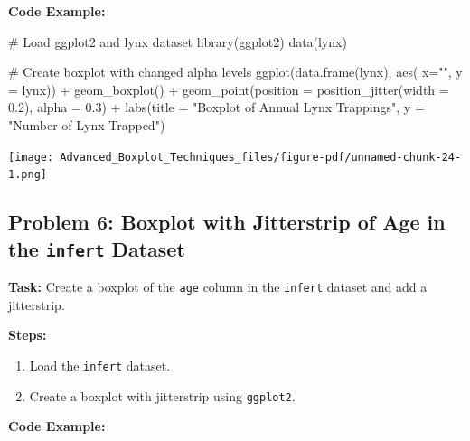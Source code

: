 \documentclass[
  letterpaper,
  DIV=11,
  numbers=noendperiod]{scrreprt}
\newenvironment{Shaded}{\begin{snugshade}}{\end{snugshade}}
\newcommand{\AttributeTok}[1]{\textcolor[rgb]{0.40,0.45,0.13}{#1}}
\newcommand{\CommentTok}[1]{\textcolor[rgb]{0.37,0.37,0.37}{#1}}
\newcommand{\FloatTok}[1]{\textcolor[rgb]{0.68,0.00,0.00}{#1}}
\newcommand{\FunctionTok}[1]{\textcolor[rgb]{0.28,0.35,0.67}{#1}}
\newcommand{\NormalTok}[1]{\textcolor[rgb]{0.00,0.23,0.31}{#1}}
\newcommand{\SpecialCharTok}[1]{\textcolor[rgb]{0.37,0.37,0.37}{#1}}
\newcommand{\StringTok}[1]{\textcolor[rgb]{0.13,0.47,0.30}{#1}}
\providecommand{\tightlist}{%
  \setlength{\itemsep}{0pt}\setlength{\parskip}{0pt}}\usepackage{longtable,booktabs,array}
\begin{document}
\textbf{Code Example:}

\begin{Shaded}
\begin{Highlighting}[]
\CommentTok{\# Load ggplot2 and lynx dataset}
\FunctionTok{library}\NormalTok{(ggplot2)}
\FunctionTok{data}\NormalTok{(lynx)}

\CommentTok{\# Create boxplot with changed alpha levels}
\FunctionTok{ggplot}\NormalTok{(}\FunctionTok{data.frame}\NormalTok{(lynx), }\FunctionTok{aes}\NormalTok{( }\AttributeTok{x=}\StringTok{""}\NormalTok{, }\AttributeTok{y =}\NormalTok{ lynx)) }\SpecialCharTok{+}
  \FunctionTok{geom\_boxplot}\NormalTok{() }\SpecialCharTok{+}
  \FunctionTok{geom\_point}\NormalTok{(}\AttributeTok{position =} \FunctionTok{position\_jitter}\NormalTok{(}\AttributeTok{width =} \FloatTok{0.2}\NormalTok{), }\AttributeTok{alpha =} \FloatTok{0.3}\NormalTok{) }\SpecialCharTok{+}
  \FunctionTok{labs}\NormalTok{(}\AttributeTok{title =} \StringTok{"Boxplot of Annual Lynx Trappings"}\NormalTok{, }\AttributeTok{y =} \StringTok{"Number of Lynx Trapped"}\NormalTok{)}
\end{Highlighting}
\end{Shaded}

\texttt{[image: Advanced\_Boxplot\_Techniques\_files/figure-pdf/unnamed-chunk-24-1.png]}

\subsection*{\texorpdfstring{Problem 6: Boxplot with Jitterstrip of Age
in the \texttt{infert}
Dataset}{Problem 6: Boxplot with Jitterstrip of Age in the infert Dataset}}\label{problem-6-boxplot-with-jitterstrip-of-age-in-the-infert-dataset}

\textbf{Task:} Create a boxplot of the \texttt{age} column in the
\texttt{infert} dataset and add a jitterstrip.

\textbf{Steps:}

\begin{enumerate}
\def\labelenumi{\arabic{enumi}.}
\tightlist
\item
  Load the \texttt{infert} dataset.
\item
  Create a boxplot with jitterstrip using \texttt{ggplot2}.
\end{enumerate}

\textbf{Code Example:}
\end{document}
